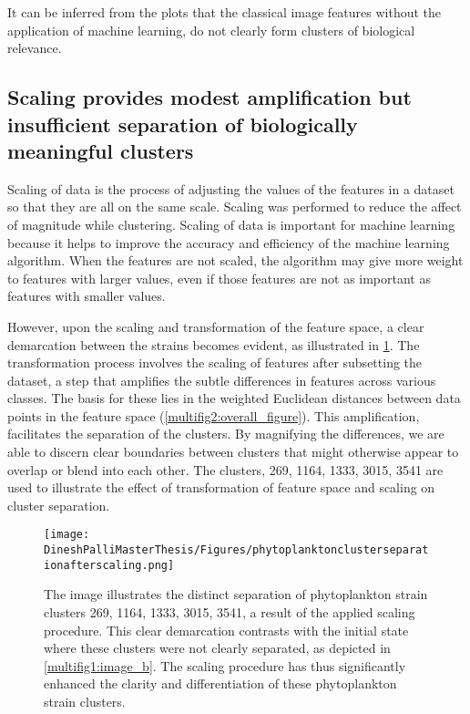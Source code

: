 \documentclass[12pt,a4paper]{article}
\begin{document}
It can be inferred from the plots that the classical image features without the application of machine learning, do not clearly form clusters of biological relevance.


\subsection{Scaling provides modest amplification but insufficient separation of biologically meaningful clusters}


Scaling of data is the process of adjusting the values of the features in a dataset so that they are all on the same scale. Scaling was performed to reduce the affect of magnitude while clustering. Scaling of data is important for machine learning because it helps to improve the accuracy and efficiency of the machine learning algorithm. When the features are not scaled, the algorithm may give more weight to features with larger values, even if those features are not as important as features with smaller values.

However, upon the scaling and transformation of the feature space, a clear demarcation between the strains becomes evident, as illustrated in \ref{clustersafterscaling}. The transformation process involves the scaling of features after subsetting the dataset, a step that amplifies the subtle differences in features across various classes. The basis for these lies in the weighted Euclidean distances between data points in the feature space (\ref{multifig2:overall_figure}). This amplification, facilitates the separation of the clusters. By magnifying the differences, we are able to discern clear boundaries between clusters that might otherwise appear to overlap or blend into each other. The clusters, 269, 1164, 1333, 3015, 3541 are used to illustrate the effect of transformation of feature space and scaling on cluster separation.

\begin{figure}
  \centering
  \texttt{[image: DineshPalliMasterThesis/Figures/phytoplanktonclusterseparationafterscaling.png]}
  \caption[Illustration depicting how scaling affects clustering]{The image illustrates the distinct separation of phytoplankton strain clusters 269, 1164, 1333, 3015, 3541, a result of the applied scaling procedure. This clear demarcation contrasts with the initial state where these clusters were not clearly separated, as depicted in \ref{multifig1:image_b}. The scaling procedure has thus significantly enhanced the clarity and differentiation of these phytoplankton strain clusters.}
  \label{clustersafterscaling}
\end{figure}
\end{document}

